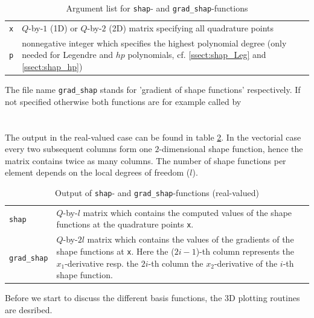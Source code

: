 \begin{table}[htb]
  \begin{tabular}{p{0.5cm}p{10.5cm}}
	{\tt x} & {\small $Q$-by-$1$ (1D) or $Q$-by-$2$ (2D) matrix specifying all quadrature points} \\
    	{\tt p} & {\small nonnegative integer which specifies the highest polynomial degree (only needed for Legendre and $hp$ polynomials, cf. \ref{ssect:shap_Leg} and \ref{ssect:shap_hp})}
  \end{tabular}
  \caption{Argument list for {\tt shap}- and {\tt grad\_shap}-functions}
  \label{tab:shap_in}
\end{table}

 The file name {\tt grad\_shap} stands for 'gradient of shape functions' respectively. If not specified otherwise both functions are for example called by \\

 \\
 \\

 The output in the real-valued case can be found in table \ref{tab:shap_out}. In the vectorial case every two subsequent columns form one $2$-dimensional shape function, hence the matrix contains twice as many columns. The number of shape functions per element depends on the local degrees of freedom ($l$).

\begin{table}[htb]
  \begin{tabular}{p{2cm}p{9cm}}
	{\tt shap} & {\small $Q$-by-$l$ matrix which contains the computed values of the shape functions at the quadrature points {\tt x}.} \\
	{\tt grad\_shap} & {\small $Q$-by-$2l$ matrix which contains the values of the gradients of the shape functions at {\tt x}. Here the ($2i-1$)-th column represents the $x_1$-derivative resp. the $2i$-th column the $x_2$-derivative of the $i$-th shape function.}
  \end{tabular}
  \caption{Output of {\tt shap}- and {\tt grad\_shap}-functions (real-valued)}
  \label{tab:shap_out}
\end{table}

 Before we start to discuss the different basis functions, the 3D plotting routines are desribed.



